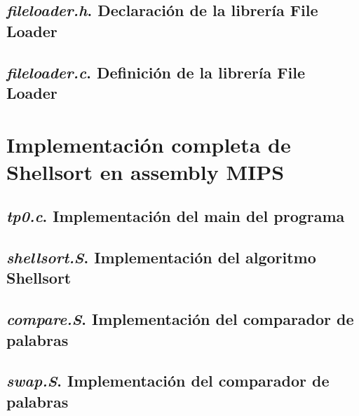 \documentclass{article}
\begin{document}
\begin{appendices}
\subsection{\textit{fileloader.h}. Declaración de la librería File Loader}
\lstset{ language = C } %
 
\bigskip\bigskip

\subsection{\textit{fileloader.c}. Definición de la librería File Loader}
\lstset{ language = C } %
 
\bigskip\bigskip




\section{Implementación completa de Shellsort en assembly MIPS}


\subsection{\textit{tp0.c}. Implementación del main del programa}
\lstset{ language = C } %
 
\bigskip\bigskip

\subsection{\textit{shellsort.S}. Implementación del algoritmo Shellsort}
\lstset{ language = [mips]Assembler} %
 
\bigskip\bigskip

\subsection{\textit{compare.S}. Implementación del comparador de palabras}
\lstset{ language = [mips]Assembler} %
 
\bigskip\bigskip

\subsection{\textit{swap.S}. Implementación del comparador de palabras}
\lstset{ language = [mips]Assembler} %
 
\bigskip\bigskip


\end{appendices}
\end{document}
